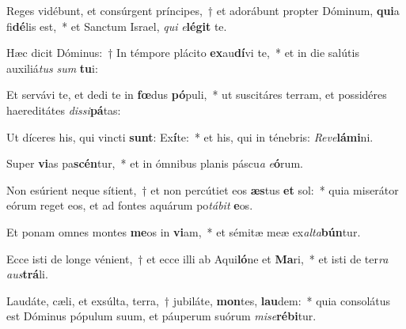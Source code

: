 \item Reges vidébunt, et consúrgent príncipes,~† et adorábunt propter Dóminum, \textbf{qui}a fi\textbf{dé}lis est,~* et Sanctum Israel, \textit{qui} \textit{e}\textbf{lé}\textbf{git} te.
\item Hæc dicit Dóminus:~† In témpore plácito \textbf{ex}au\textbf{dí}vi te,~* et in die salútis auxiliá\textit{tus} \textit{sum} \textbf{tu}i:
\item Et servávi te, et dedi te in \textbf{fœ}dus \textbf{pó}puli,~* ut suscitáres terram, et possidéres haereditátes \textit{dis}\textit{si}\textbf{pá}tas:
\item Ut díceres his, qui vincti \textbf{sunt}: Ex\textbf{í}te:~* et his, qui in ténebris: \textit{Re}\textit{ve}\textbf{lá}\textbf{mi}ni.
\item Super \textbf{vi}as pa\textbf{scén}tur,~* et in ómnibus planis páscu\textit{a} \textit{e}\textbf{ó}rum.
\item Non esúrient neque sítient,~† et non percútiet eos \textbf{æs}tus \textbf{et} sol:~* quia miserátor eórum reget eos, et ad fontes aquárum po\textit{tá}\textit{bit} \textbf{e}os.
\item Et ponam omnes montes \textbf{me}os in \textbf{vi}am,~* et sémitæ meæ ex\textit{al}\textit{ta}\textbf{bún}tur.
\item Ecce isti de longe vénient,~† et ecce illi ab Aqui\textbf{ló}ne et \textbf{Ma}ri,~* et isti de ter\textit{ra} \textit{aus}\textbf{trá}li.
\item Laudáte, cæli, et exsúlta, terra,~† jubiláte, \textbf{mon}tes, \textbf{lau}dem:~* quia consolátus est Dóminus pópulum suum, et páuperum suórum \textit{mi}\textit{se}\textbf{ré}\textbf{bi}tur.
